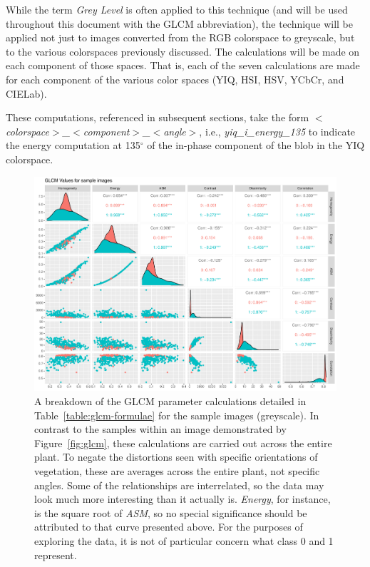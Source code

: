 \documentclass[letterpaper]{article}
\begin{document}
{While the term \textit{Grey Level} is often applied to this technique (and will be used throughout this document with the GLCM abbreviation), the technique will be applied not just to images converted from the RGB colorspace to greyscale, but to the various colorspaces previously discussed. The calculations will be made on each component of those spaces.  That is, each of the seven calculations are made for each component of the various color spaces (YIQ, HSI, HSV, YCbCr, and CIELab). 

These computations, referenced in subsequent sections, take the form \textit{$<$colorspace$>$\_$<$component$>$\_$<$angle$>$}, i.e., \textit{yiq\_i\_energy\_135} to indicate the energy computation at 135$^{\circ}$ of the in-phase component of the blob in the YIQ colorspace.

%
%

\begin{figure}[H]
	\centering
	\includegraphics[width=0.9\linewidth]{./figures/glcm-pairs.pdf}
	\caption[GLCM parameter correlation assessment]{A breakdown of the GLCM parameter calculations detailed in Table~\ref{table:glcm-formulae} for the sample images (greyscale). In contrast to the samples within an image demonstrated by Figure~\ref{fig:glcm}, these calculations are carried out across the entire plant. To negate the distortions seen with specific orientations of vegetation, these are averages across the entire plant, not specific angles. Some of the relationships are interrelated, so the data may look much more interesting than it actually is. \textit{Energy}, for instance, is the square root of \textit{ASM}, so no special significance should be attributed to that curve presented above. For the purposes of exploring the data, it is not of particular concern what class 0 and 1 represent.}
\end{figure} 

}
\end{document}
